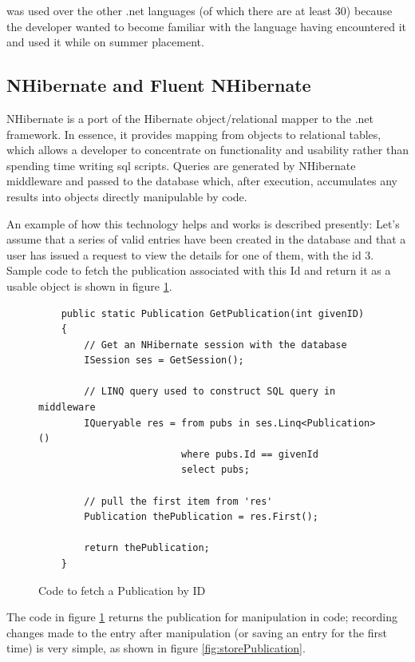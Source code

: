 \cs was used over the other .\gls{net} languages (of which there are at least 30) \cite{csUnleashed} because the developer wanted to become familiar with the language having encountered it and used it while on summer placement.

\subsection{NHibernate and Fluent NHibernate}
\label{nhibernate}
NHibernate is a port of the Hibernate object/relational mapper to the .\gls{net} framework. In essence, it provides mapping from objects to relational tables, which allows a developer to concentrate on functionality and usability rather than spending time writing \gls{sql} scripts. Queries are generated by NHibernate middleware and passed to the database which, after execution, accumulates any results into objects directly manipulable by \cs code. 

An example of how this technology helps and works is described presently: Let's assume that a series of valid entries have been created in the database and that a user has issued a request to view the details for one of them, with the \gls{id} 3.  Sample code to fetch the publication associated with this Id and return it as a usable object is shown in figure \ref{fig:fetchPubCode}.

\begin{figure}
	\begin{center}
			\lstset{language=CSharp} 
			\begin{lstlisting}
	public static Publication GetPublication(int givenID)
	{
	    // Get an NHibernate session with the database
	    ISession ses = GetSession(); 
	
	   	// LINQ query used to construct SQL query in middleware
	    IQueryable res = from pubs in ses.Linq<Publication>()
	                     where pubs.Id == givenId
	                     select pubs;
	                        
	    // pull the first item from 'res' 
	    Publication thePublication = res.First();
	    
	    return thePublication;
	}
			\end{lstlisting}
		\caption{Code to fetch a Publication by ID}
		\label{fig:fetchPubCode}
	\end{center}
\end{figure}

The code in figure \ref{fig:fetchPubCode} returns the publication for manipulation in code; recording changes made to the entry after manipulation (or saving an entry for the first time) is very simple, as shown in figure \ref{fig:storePublication}.

